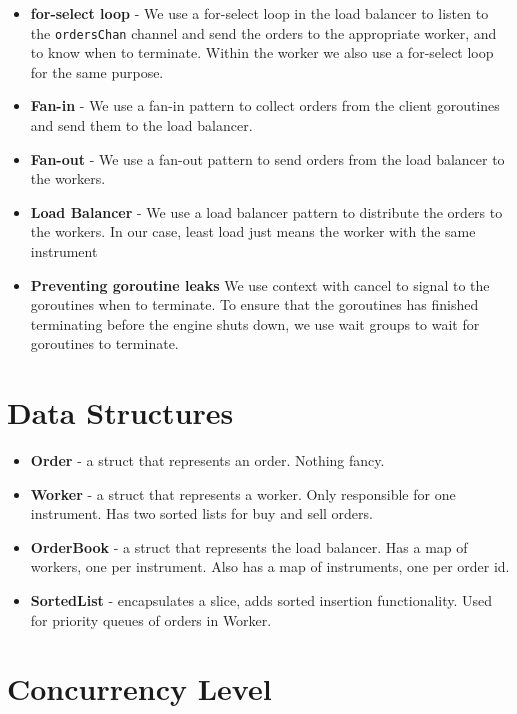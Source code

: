 \documentclass[11pt]{article}
\begin{document}
\begin{itemize}

\item \textbf{for-select loop} - We use a for-select loop in the load balancer to listen to the
    \texttt{ordersChan} channel and send the orders to the appropriate worker, and to know when to
    terminate. Within the worker we also use a for-select loop for the same purpose.
\item \textbf{Fan-in} - We use a fan-in pattern to collect orders from the client goroutines and send them to the load balancer.
\item \textbf{Fan-out} - We use a fan-out pattern to send orders from the load balancer to the workers.
\item \textbf{Load Balancer} - We use a load balancer pattern to distribute the orders to the workers. In our case, least load just means the worker with the same instrument
\item \textbf{Preventing goroutine leaks} We use context with cancel to signal to the goroutines when to
    terminate. To ensure that the goroutines has finished terminating before the engine shuts down,
    we use wait groups to wait for goroutines to terminate.

\end{itemize}

\section{Data Structures}

\begin{itemize}
    \item \textbf{Order} - a struct that represents an order. Nothing fancy.
    \item \textbf{Worker} - a struct that represents a worker. Only responsible for one instrument. Has two sorted lists for buy and sell orders.
    \item \textbf{OrderBook} - a struct that represents the load balancer. Has a map of workers, one
        per instrument. Also has a map of instruments, one per order id.
    \item \textbf{SortedList} - encapsulates a slice, adds sorted insertion functionality. Used for priority queues of orders in Worker.
\end{itemize}

\section{Concurrency Level}
\end{document}
